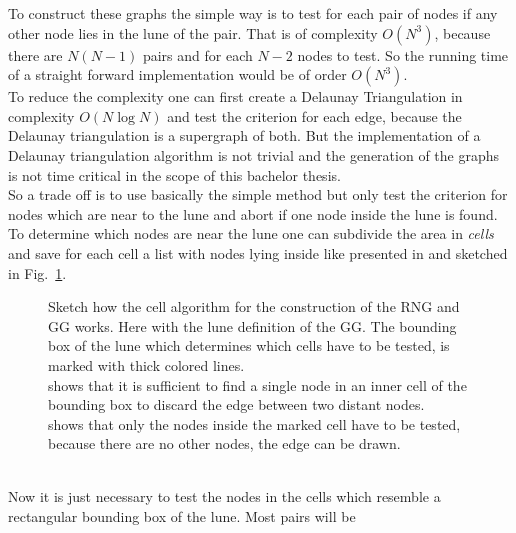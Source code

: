     To construct these graphs the simple way is to test for each
    pair of nodes if any other node lies in
    the lune of the pair. That is of complexity \(O (N^3)\), because
    there are \(N(N-1)\) pairs and for each \(N-2\) nodes to test. So
    the running time of a straight forward implementation would be of
    order \(O(N^3)\).\\
    To reduce the complexity one can first create a Delaunay
    Triangulation in complexity \(O (N \log N)\)
    \cite{RNGCell} and test the criterion for each edge, because
    the Delaunay triangulation is a supergraph of both. But the
    implementation of a Delaunay triangulation algorithm is not trivial
    and the generation of the graphs is not time critical in the scope
    of this bachelor thesis.\\
    So a trade off is to use basically the simple method but only test
    the criterion for nodes which are near to the lune and abort if
    one node inside the lune is found. To determine which nodes are
    near the lune one can subdivide the area in \emph{cells} and save
    for each cell a list with nodes lying inside like presented in
    \cite{RNGCell} and sketched in Fig.\ \ref{fig:cell}.
    \begin{figure}[htbp]
        \centering
        \caption[Sketch how the Cell Method Works]
        {
            Sketch how the cell algorithm for the construction of the
            RNG and GG works. Here with the lune definition of the GG.
            The bounding box of the lune which determines which cells have
            to be tested, is marked with thick colored lines.\\
             shows that it is sufficient to find a
            single node in an inner cell of the bounding box to discard
            the edge between two distant nodes.\\
             shows that only the nodes inside the
            marked cell have to be tested, because there are no other nodes,
            the edge can be drawn.
        }
        \label{fig:cell}
    \end{figure}\\
    Now it is just necessary to test the nodes in the cells which
    resemble a rectangular bounding box of the lune. Most pairs will be
